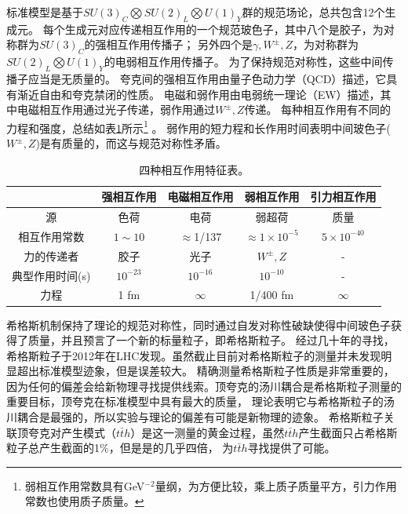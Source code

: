 标准模型是基于$SU(3)_C\bigotimes SU(2)_L\bigotimes U(1)_Y$群的规范场论，总共包含12个生成元。
每个生成元对应传递相互作用的一个规范玻色子，其中八个是胶子，为对称群为$SU(3)_C$的强相互作用传播子；
另外四个是$\gamma, W^{\pm}, Z$，为对称群为$SU(2)_L\bigotimes U(1)_Y$的电弱相互作用传播子。
为了保持规范对称性，这些中间传播子应当是无质量的。
夸克间的强相互作用由量子色动力学（QCD）描述，它具有渐近自由和夸克禁闭的性质。
电磁和弱作用由电弱统一理论（EW）描述，其中电磁相互作用通过光子传递，弱作用通过$W^{\pm}, Z$传递。
每种相互作用有不同的力程和强度，总结如表\ref{tab:summary_interactions}所示\footnote{弱相互作用常数具有GeV$^{-2}$量纲，为方便比较，乘上质子质量平方，引力作用常数也使用质子质量。} 。
弱作用的短力程和长作用时间表明中间玻色子($W^{\pm}, Z$)是有质量的，而这与规范对称性矛盾。
\begin{table}[h]
\centering
\begin{tabular}{c|c|c|c|c}
\hline
     		&强相互作用   &电磁相互作用  &弱相互作用 &引力相互作用 \\
\hline
源		&色荷  &电荷   &弱超荷   &质量 \\
相互作用常数 &$1\sim 10$  &$\approx$1/137   &$\approx 1\times 10^{-5}$    &$5\times 10^{-40}$ \\
力的传递者 &胶子  &光子  &$W^{\pm}, Z$  &- \\
典型作用时间(s) &$10^{-23}$  &$10^{-16}$  &$10^{-10}$   &- \\
力程  &1 fm  &$\infty$   &1/400 fm  &$\infty$  \\
\hline
\end{tabular}
\caption{四种相互作用特征表。}
\label{tab:summary_interactions}
\end{table}

希格斯机制\cite{PhysRevLett.13.321,HIGGS1964132,PhysRevLett.13.508,PhysRevLett.13.585,PhysRev.145.1156,PhysRev.155.1554}保持了理论的规范对称性，同时通过自发对称性破缺使得中间玻色子获得了质量，并且预言了一个新的标量粒子，即希格斯粒子。
经过几十年的寻找，希格斯粒子于2012年在LHC发现\cite{Aad:2012tfa,Chatrchyan:2012xdj}。虽然截止目前对希格斯粒子的测量并未发现明显超出标准模型迹象，但是误差较大。
精确测量希格斯粒子性质是非常重要的，因为任何的偏差会给新物理寻找提供线索。顶夸克的汤川耦合是希格斯粒子测量的重要目标，顶夸克在标准模型中具有最大的质量，
理论表明它与希格斯粒子的汤川耦合是最强的，所以实验与理论的偏差有可能是新物理的迹象。
希格斯粒子关联顶夸克对产生模式（$t\bar{t}h$）是这一测量的黄金过程，虽然$t\bar{t}h$产生截面只占希格斯粒子总产生截面的1\%，但是\RunTwo 是\RunOne 的几乎四倍，
为$t\bar{t}h$寻找提供了可能。

